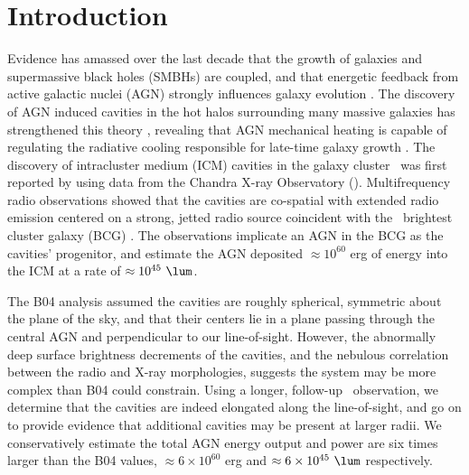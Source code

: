 \documentclass[11pt, preprint]{aastex}
\begin{document}

\keywords{\mykeywords}

\section{Introduction}
\label{sec:intro}

Evidence has amassed over the last decade that the growth of galaxies
and supermassive black holes (SMBHs) are coupled, and that energetic
feedback from active galactic nuclei (AGN) strongly influences galaxy
evolution \citep[\eg][]{1995ARA&A..33..581K, 1998A&A...331L...1S,
  2000MNRAS.311..576K, 2002ApJ...574..740T}. The discovery of AGN
induced cavities in the hot halos surrounding many massive galaxies
has strengthened this theory \citep[see][for a review]{mcnamrev},
revealing that AGN mechanical heating is capable of regulating the
radiative cooling responsible for late-time galaxy growth
\citep[\eg][]{birzan04, dunn06, rafferty06}. The discovery of
intracluster medium (ICM) cavities in the galaxy cluster \rbs\ was
first reported by \citet{schindler01} using data from the Chandra
X-ray Observatory (\cxo). Multifrequency radio observations showed
that the cavities are co-spatial with extended radio emission centered
on a strong, jetted radio source coincident with the \rbs\ brightest
cluster galaxy (BCG) \citep{2002astro.ph..1349D, gitti06,
  birzan08}. The observations implicate an AGN in the BCG as the
cavities' progenitor, and \citet[][hereafter B04]{birzan04} estimate
the AGN deposited $\approx 10^{60}$ erg of energy into the ICM at a
rate of $\approx 10^{45} ~\lum$.

The B04 analysis assumed the cavities are roughly spherical, symmetric
about the plane of the sky, and that their centers lie in a plane
passing through the central AGN and perpendicular to our
line-of-sight. However, the abnormally deep surface brightness
decrements of the cavities, and the nebulous correlation between the
radio and X-ray morphologies, suggests the system may be more complex
than B04 could constrain. Using a longer, follow-up \cxo\ observation,
we determine that the cavities are indeed elongated along the
line-of-sight, and go on to provide evidence that additional cavities
may be present at larger radii. We conservatively estimate the total
AGN energy output and power are six times larger than the B04 values,
$\approx 6 \times 10^{60}$ erg and $\approx 6 \times 10^{45} ~\lum$
respectively.
\end{document}
